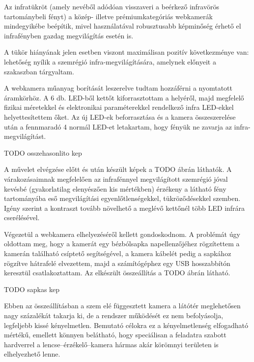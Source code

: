 Az infratükröt (amely nevéből adódóan visszaveri a beérkező infravörös tartománybeli fényt) a közép- illetve prémiumkategóriás webkamerák mindegyikébe beépítik, mivel használatával robusztusabb képminőség érhető el infrafényben gazdag megvilágítás esetén is.

A tükör hiányának jelen esetben viszont maximálisan pozitív következménye van: lehetőség nyílik a szemrégió infra-megvilágítására, amelynek előnyeit a  szakaszban tárgyaltam.

\bigskip

A webkamera műanyag borítását leszerelve tudtam hozzáférni a nyomtatott áramkörhöz. A 6 db. LED-ből kettőt kiforrasztottam a helyéről, majd megfelelő fizikai méretekkel és elektronikai paraméterekkel rendelkező infra LED-ekkel helyettesítettem őket. Az új LED-ek beforrasztása és a kamera összeszerelése után a fennmaradó 4 normál LED-et letakartam, hogy fényük ne zavarja az infra-megvilágítást.

TODO osszehasonlito kep

A művelet elvégzése előtt és után készült képek a TODO ábrán láthatók. A várakozásaimnak megfelelően az infrafénnyel megvilágított szemrégió jóval kevésbé (gyakorlatilag elenyészően kis mértékben) érzékeny a látható fény tartományába eső megvilágítási egyenlőtlenségekkel, tükröződésekkel szemben. Igény szerint a kontraszt tovább növelhető a meglévő kettőnél több LED infrára cserélésével.

\bigskip

Végezetül a webkamera elhelyezéséről kellett gondoskodnom. A problémát úgy oldottam meg, hogy a kamerát egy bézbólsapka napellenzőjéhez rögzítettem a kamerán található csíptető segítségével, a kamera kábelét pedig a sapkához rögzítve hátrafelé elvezettem, majd a számítógéphez egy USB hosszabbítón keresztül csatlakoztattam. Az elkészült összeállítás a TODO ábrán látható.

TODO sapkas kep

Ebben az összeállításban a szem elé függesztett kamera a látótér meglehetősen nagy százalékát takarja ki, de a rendszer működését ez nem befolyásolja, legfeljebb kissé kényelmetlen. Bemutató célokra ez a kényelmetlenség elfogadható mértékű, emellett könnyen belátható, hogy speciálisan a feladatra szabott hardverrel a lencse--érzékelő--kamera hármas akár körömnyi területen is elhelyezhető lenne.